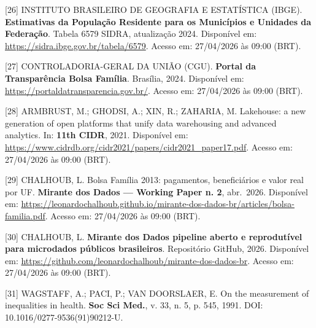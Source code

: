 \documentclass[12pt,a4paper,oneside]{article}
\begin{document}
\begin{singlespace}
\noindent\hangindent=1.25cm\label{ref:ibge}
[26] INSTITUTO BRASILEIRO DE GEOGRAFIA E ESTATÍSTICA (IBGE).
\textbf{Estimativas da População Residente para os Municípios e
Unidades da Federação}. Tabela 6579 SIDRA, atualização 2024.
Disponível em: \url{https://sidra.ibge.gov.br/tabela/6579}.
Acesso em: 27/04/2026 às 09:00 (BRT).\par\smallskip

\noindent\hangindent=1.25cm\label{ref:cgu}
[27] CONTROLADORIA-GERAL DA UNIÃO (CGU). \textbf{Portal da
Transparência \textendash{} Bolsa Família}. Brasília, 2024.
Disponível em:
\url{https://portaldatransparencia.gov.br/}.
Acesso em: 27/04/2026 às 09:00 (BRT).\par\smallskip

\noindent\hangindent=1.25cm\label{ref:armbrust}
[28] ARMBRUST, M.; GHODSI, A.; XIN, R.; ZAHARIA, M. Lakehouse: a
new generation of open platforms that unify data warehousing and
advanced analytics. In: \textbf{11th CIDR}, 2021. Disponível em:
\url{https://www.cidrdb.org/cidr2021/papers/cidr2021_paper17.pdf}.
Acesso em: 27/04/2026 às 09:00 (BRT).\par\smallskip

\noindent\hangindent=1.25cm\label{ref:wp-pbf}
[29] CHALHOUB, L. Bolsa Família 2013: pagamentos,
beneficiários e valor real por UF. \textbf{Mirante dos Dados —
Working Paper n. 2}, abr.\ 2026. Disponível em:
\url{https://leonardochalhoub.github.io/mirante-dos-dados-br/articles/bolsa-familia.pdf}.
Acesso em: 27/04/2026 às 09:00 (BRT).\par\smallskip

\noindent\hangindent=1.25cm\label{ref:repo}
[30] CHALHOUB, L. \textbf{Mirante dos Dados \textendash{} pipeline
aberto e reprodutível para microdados públicos brasileiros}.
Repositório GitHub, 2026. Disponível em:
\url{https://github.com/leonardochalhoub/mirante-dos-dados-br}.
Acesso em: 27/04/2026 às 09:00 (BRT).\par\smallskip

\noindent\hangindent=1.25cm\label{ref:wagstaff}
[31] WAGSTAFF, A.; PACI, P.; VAN DOORSLAER, E. On the measurement
of inequalities in health. \textbf{Soc Sci Med.}, v. 33, n. 5,
p. 545, 1991. DOI: 10.1016/0277-9536(91)90212-U.
\par\smallskip


\end{singlespace}
\end{document}

